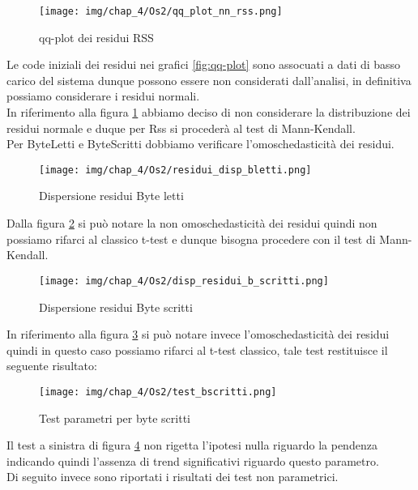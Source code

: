 \begin{figure}[H]
    \centering
    \texttt{[image: img/chap\_4/Os2/qq\_plot\_nn\_rss.png]}
    \caption{qq-plot dei residui RSS}
    \label{fig:residui_non_normali}
\end{figure}    
\noindent
Le code iniziali dei residui nei grafici \ref{fig:qq-plot} sono assocuati a dati di basso carico del sistema dunque possono essere non considerati dall'analisi, in definitiva possiamo considerare i residui normali.\\
In riferimento alla figura \ref{fig:residui_non_normali} abbiamo deciso di non considerare la distribuzione dei residui normale e duque per Rss si procederà al test di Mann-Kendall.\\
Per ByteLetti e ByteScritti dobbiamo verificare l'omoschedasticità dei residui.\\
\begin{figure}[H]
    \centering
    \texttt{[image: img/chap\_4/Os2/residui\_disp\_bletti.png]}
    \caption{Dispersione residui Byte letti }
    \label{fig:residui_non_omoschedastici4}
\end{figure}
\noindent
Dalla figura \ref{fig:residui_non_omoschedastici4} si può notare la non omoschedasticità dei residui quindi non possiamo rifarci al classico t-test e dunque bisogna procedere con il test di Mann-Kendall.
\begin{figure}[H]
    \centering
    \texttt{[image: img/chap\_4/Os2/disp\_residui\_b\_scritti.png]}
    \caption{Dispersione residui Byte scritti }
    \label{fig:residui_omoschedastici5}
\end{figure}
\noindent
In riferimento alla figura \ref{fig:residui_omoschedastici5} si può notare invece l'omoschedasticità dei residui quindi in questo caso possiamo rifarci al t-test classico, tale test restituisce il seguente risultato:
\begin{figure}[H]
    \centering
    \texttt{[image: img/chap\_4/Os2/test\_bscritti.png]}
    \caption{Test parametri per byte scritti}
    \label{fig:test_bscritti}
\end{figure}
\noindent
Il test a sinistra di figura \ref{fig:test_bscritti} non rigetta l'ipotesi nulla riguardo la pendenza indicando quindi l'assenza di trend significativi riguardo questo parametro.\\
Di seguito invece sono riportati i risultati dei test non parametrici.
